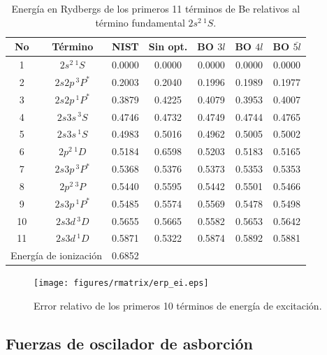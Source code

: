 \begin{table}
\centering
\begin{tabular}{|cc|ccccc|}
\hline 
No & Término      & NIST & Sin opt. & BO $3l$ & BO $4l$ & BO $\bar{5l}$ \\
\hline 
\hline 
1 & $2s^2\,^1S$   & 0.0000 & 0.0000 & 0.0000 & 0.0000 & 0.0000 \\
2 & $2s2p\,^3P^*$ & 0.2003 & 0.2040 & 0.1996 & 0.1989 & 0.1977 \\
3 & $2s2p\,^1P^*$ & 0.3879 & 0.4225 & 0.4079 & 0.3953 & 0.4007 \\
4 & $2s3s\,^3S$   & 0.4746 & 0.4732 & 0.4749 & 0.4744 & 0.4765 \\
5 & $2s3s\,^1S$   & 0.4983 & 0.5016 & 0.4962 & 0.5005 & 0.5002 \\
6 & $2p^2\,^1D$   & 0.5184 & 0.6598 & 0.5203 & 0.5183 & 0.5165 \\
7 & $2s3p\,^3P^*$ & 0.5368 & 0.5376 & 0.5373 & 0.5353 & 0.5353 \\
8 & $2p^2\,^3P$   & 0.5440 & 0.5595 & 0.5442 & 0.5501 & 0.5466 \\
9 & $2s3p\,^1P^*$ & 0.5485 & 0.5574 & 0.5569 & 0.5478 & 0.5498 \\
10 & $2s3d\,^3D$  & 0.5655 & 0.5665 & 0.5582 & 0.5653 & 0.5642 \\
11 & $2s3d\,^1D$  & 0.5871 & 0.5322 & 0.5874 & 0.5892 & 0.5881 \\
\hline
\multicolumn{2}{l}{Energía de ionización} & 0.6852 &  &  &  &  \\ 
\hline
\end{tabular}
\caption[Energías de excitación de Be.]
{Energía en Rydbergs de los primeros 11 términos de Be relativos 
al término fundamental $2s^2\,^1S$.}
\label{tab:exener}
\end{table}

\begin{figure}
\centering
\texttt{[image: figures/rmatrix/erp\_ei.eps]} 
\caption[Error relativo de los primeros 10 términos de excitación.]
{Error relativo de los primeros 10 términos de energía de excitación.}
\label{fig:exener}
\end{figure}

\subsection{Fuerzas de oscilador de asborción}

